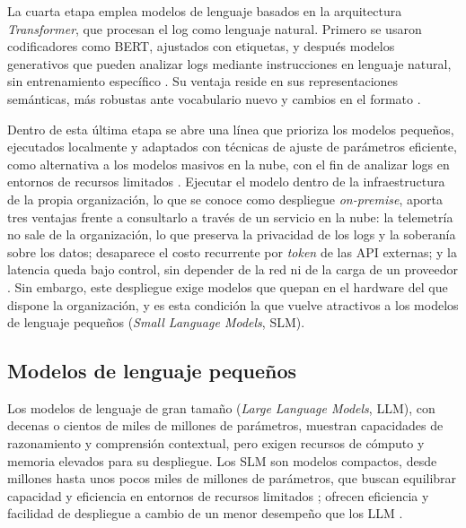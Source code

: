 La cuarta etapa emplea modelos de lenguaje basados en la arquitectura \textit{Transformer}, que procesan el log como lenguaje natural. Primero se usaron codificadores como BERT, ajustados con etiquetas, y después modelos generativos que pueden analizar logs mediante instrucciones en lenguaje natural, sin entrenamiento específico \cite{liu2024_logprompt}. Su ventaja reside en sus representaciones semánticas, más robustas ante vocabulario nuevo y cambios en el formato \cite{murphy2024_embeddings}.

Dentro de esta última etapa se abre una línea que prioriza los modelos pequeños, ejecutados localmente y adaptados con técnicas de ajuste de parámetros eficiente, como alternativa a los modelos masivos en la nube, con el fin de analizar logs en entornos de recursos limitados \cite{saha2025_slm_minimal}. Ejecutar el modelo dentro de la infraestructura de la propia organización, lo que se conoce como despliegue \textit{on-premise}, aporta tres ventajas frente a consultarlo a través de un servicio en la nube: la telemetría no sale de la organización, lo que preserva la privacidad de los logs y la soberanía sobre los datos; desaparece el costo recurrente por \textit{token} de las API externas; y la latencia queda bajo control, sin depender de la red ni de la carga de un proveedor \cite{pardeshi2026_smartllm}. Sin embargo, este despliegue exige modelos que quepan en el hardware del que dispone la organización, y es esta condición la que vuelve atractivos a los modelos de lenguaje pequeños (\textit{Small Language Models}, SLM).

\subsection{Modelos de lenguaje pequeños}\label{sec:mt_slm}

Los modelos de lenguaje de gran tamaño (\textit{Large Language Models}, LLM), con decenas o cientos de miles de millones de parámetros, muestran capacidades de razonamiento y comprensión contextual, pero exigen recursos de cómputo y memoria elevados para su despliegue. Los SLM son modelos compactos, desde millones hasta unos pocos miles de millones de parámetros, que buscan equilibrar capacidad y eficiencia en entornos de recursos limitados \cite{wang2025_slm_survey}; ofrecen eficiencia y facilidad de despliegue a cambio de un menor desempeño que los LLM \cite{chen2025_collab_survey}.


